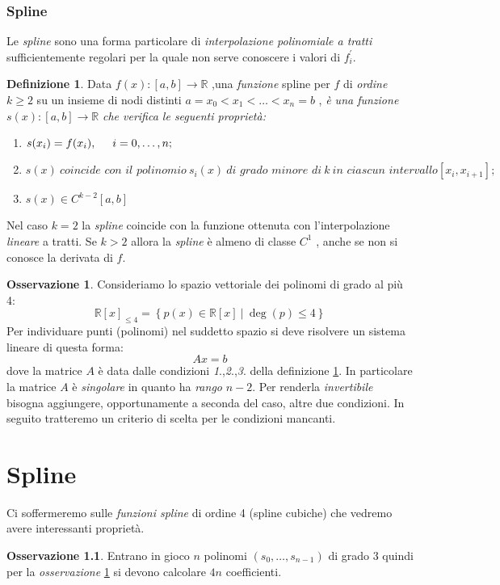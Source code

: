 \documentclass[a4paper,12pt]{report}
\newcommand\tab[1][0.5cm]{\hspace*{#1}}
\theoremstyle{definition}
\newtheorem{defin}{Definizione}[chapter]
\newtheorem{oss}{Osservazione}[chapter]
\begin{document}
\subsection{Spline}
Le \textit{spline} sono una forma particolare di \textit{interpolazione polinomiale a tratti} sufficientemente regolari per la quale non serve conoscere i valori di $f_i^\prime$.
\begin{defin} \label{spline}
	Data $f(x) : [a,b] \to \mathbb{R}$ ,una \textit{funzione} spline per $f$ di \textit{ordine $k \geq 2$} su un insieme di nodi distinti $a = x_0 < x_1 < \ldots < x_n =  b$ , \textit{è una funzione} $s(x) : [a,b] \to \mathbb{R}$ \textit{che verifica le seguenti proprietà:}
	\begin{enumerate}
		\item $s(x_i) = f(x_i) ,\tab i = 0,\ldots,n;$
		\item $s(x)\ \textit{coincide con il polinomio}\ s_i(x) \ \textit{di grado minore di}\ k \ 
		\textit{in ciascun intervallo} [x_i , x_{i+1}];$
		\item $s(x) \in C^{k-2}[a,b]$
	\end{enumerate}
	
\end{defin}
Nel caso $k = 2$ la \textit{spline} coincide con la funzione ottenuta con l'interpolazione \textit{lineare} a tratti. Se $k > 2$ allora la \textit{spline} è almeno di classe $C^1$ , anche se non si conosce la derivata di $f$.
\begin{oss}\label{spazvet}
	Consideriamo lo spazio vettoriale dei polinomi di grado al più 4: $$\mathbb{R}[x]_{\leq4} = \left\{ p(x) \in  \mathbb{R}[x] \ \big| \ \deg(p) \leq 4 \right\} $$
	Per individuare punti (polinomi) nel suddetto spazio si deve risolvere un sistema lineare di questa forma:
	$$Ax = b$$
	dove la matrice $A$ è data dalle condizioni \emph{1}.,\emph{2}.,\emph{3}. della definizione \ref{spline}. In particolare la matrice $A$ è \textit{singolare} in quanto ha \textit{rango} $n-2$.
	Per renderla \textit{invertibile} bisogna aggiungere, opportunamente a seconda del caso, altre due condizioni. In seguito tratteremo un criterio di scelta per le condizioni mancanti.
\end{oss}
\chapter{Spline}\label{capSpline}
Ci soffermeremo sulle \textit{funzioni spline} di ordine 4
(spline cubiche) che vedremo avere interessanti proprietà.
\begin{oss}
	Entrano in gioco $n$ polinomi $(s_0, \ldots , s_{n-1})$ di grado 3 quindi per la \textit{osservazione} \ref{spazvet} si devono calcolare $4n$ coefficienti.
\end{oss}
\end{document}
